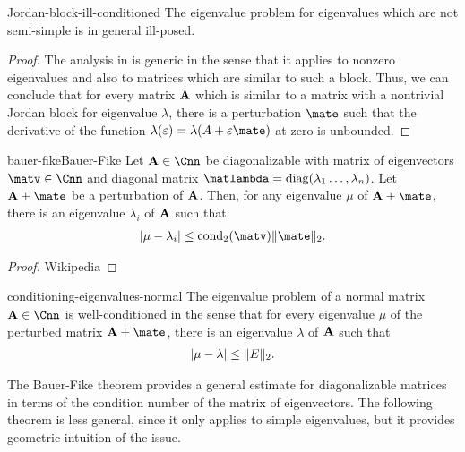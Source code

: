 \begin{Theorem}{Jordan-block-ill-conditioned}
  The eigenvalue problem for eigenvalues which are not semi-simple is
  in general ill-posed.
\end{Theorem}

\begin{proof}
  The analysis in  is
  generic in the sense that it applies to nonzero eigenvalues and also
  to matrices which are similar to such a block. Thus, we can conclude
  that for every matrix $\mathbf A$ which is similar to a matrix with a
  nontrivial Jordan block for eigenvalue $\lambda$, there is a
  perturbation $\mate$ such that the derivative of the function
  $\lambda(\epsilon) = \lambda(A+\epsilon\mate)$ at zero is unbounded.
\end{proof}

\begin{Theorem*}{bauer-fike}{Bauer-Fike}
  Let $\mata\in \Cnn$ be diagonalizable with matrix of eigenvectors
  $\matv \in \Cnn$ and diagonal matrix
  $\matlambda = \diag(\lambda_1\dots,\lambda_n)$. Let $\mata+\mate$ be
  a perturbation of $\mathbf A$. Then, for any eigenvalue $\mu$ of
  $\mata+\mate$, there is an eigenvalue $\lambda_i$ of $\mathbf A$ such
  that
  \begin{gather}
    \abs{\mu-\lambda_i} \le \cond_2(\matv) \norm{\mate}_2.
  \end{gather}
\end{Theorem*}

\begin{proof}
  Wikipedia
\end{proof}

\begin{Corollary}{conditioning-eigenvalues-normal}
  The eigenvalue problem of a normal matrix $\mata\in\Cnn$ is
  well-conditioned in the sense that for every eigenvalue $\mu$ of the
  perturbed matrix $\mata+\mate$, there is an eigenvalue $\lambda$ of
  $\mathbf A$ such that
  \begin{gather}
    \lvert\mu-\lambda\rvert \le \lVert E\rVert_2.
  \end{gather}
\end{Corollary}

The Bauer-Fike theorem provides a general estimate for diagonalizable
matrices in terms of the condition number of the matrix of
eigenvectors. The following theorem is less general, since it only
applies to simple eigenvalues, but it provides geometric intuition of
the issue.

